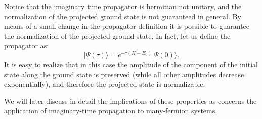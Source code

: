 Notice that the imaginary time propagator is hermitian not unitary, and the normalization of the projected ground state is not guaranteed in general. By means of a small change in the propagator definition it is possible to guarantee the normalization of the projected ground state. In fact, let us define the propagator as:
\begin{equation}
\label{eq:gentauprop}
\vert\Psi(\tau)\rangle=e^{-\tau(H-E_0)}\vert\Psi(0)\rangle.
\end{equation}
It is easy to realize that in this case the amplitude of the component of the initial state along the ground state is preserved (while all other amplitudes decrease exponentially), and therefore the projected state is normalizable.

We will later discuss in detail the implications of these properties as concerns the application of imaginary-time propagation to many-fermion systems. 

